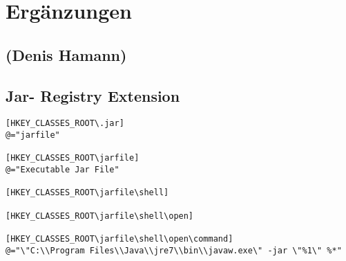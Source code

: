 \section{Ergänzungen}
\label{sec:Ergänzungen}

\subsection*{(Denis Hamann)}

\subsection{Jar- Registry Extension}
\label{subsec:jarreg}

\begin{lstlisting}
[HKEY_CLASSES_ROOT\.jar]
@="jarfile"

[HKEY_CLASSES_ROOT\jarfile]
@="Executable Jar File"

[HKEY_CLASSES_ROOT\jarfile\shell]

[HKEY_CLASSES_ROOT\jarfile\shell\open]

[HKEY_CLASSES_ROOT\jarfile\shell\open\command]
@="\"C:\\Program Files\\Java\\jre7\\bin\\javaw.exe\" -jar \"%1\" %*"
\end{lstlisting}